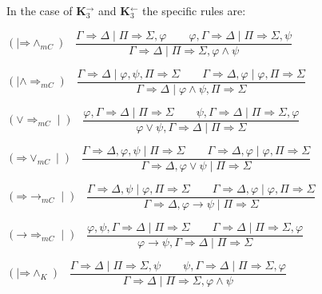 \documentclass[11pt,a4paper,titlepage]{article}
\theoremstyle{definition}
\newcommand{\3}{\vspace{.3in}}
\newcommand{\2}{\vspace{.2in}}
\newcommand{\1}{\vspace{.1in}}
\newcommand{\5}{\vspace{.05in}}
\begin{document}
\1


In the case of {\bf K$_3^\rightarrow$} and {\bf K$_3^\leftarrow$} the specific rules are:

\1

\noindent$(\mid \mathord{\Rightarrow}\mathord{\wedge_{mC}})$ \ $\dfrac{\Gamma
	\Rightarrow \Delta \mid \Pi\Rightarrow\Sigma, \varphi \qquad \varphi, \Gamma\Rightarrow\Delta \mid \Pi\Rightarrow\Sigma, \psi}{\Gamma\Rightarrow\Delta \mid \Pi\Rightarrow\Sigma, \varphi\wedge\psi}$ 

\1

\noindent$(\mid \mathord{\wedge}\mathord{\Rightarrow_{mC}})$ \ $\dfrac{\Gamma\Rightarrow \Delta \mid \varphi, \psi, \Pi\Rightarrow\Sigma \qquad \Gamma\Rightarrow\Delta, \varphi \mid \varphi, \Pi\Rightarrow\Sigma}{\Gamma\Rightarrow\Delta \mid \varphi\wedge\psi, \Pi\Rightarrow\Sigma}$ 

\1

\noindent$(\mathord{\vee}\mathord{\Rightarrow_{mC}}\mid)$ \ $\dfrac{\varphi, \Gamma
	\Rightarrow \Delta \mid \Pi\Rightarrow\Sigma \qquad \psi, \Gamma\Rightarrow\Delta \mid \Pi\Rightarrow\Sigma, \varphi}{\varphi\vee\psi, \Gamma\Rightarrow\Delta \mid \Pi\Rightarrow\Sigma}$ 

\1

\noindent$(\mathord{\Rightarrow}\mathord{\vee_{mC}}\mid)$ \ $\dfrac{\Gamma\Rightarrow \Delta, \varphi, \psi \mid \Pi\Rightarrow\Sigma \qquad \Gamma\Rightarrow\Delta, \varphi \mid \varphi, \Pi\Rightarrow\Sigma}{\Gamma\Rightarrow\Delta, \varphi\vee\psi \mid \Pi\Rightarrow\Sigma}$ 

\1

\noindent$(\mathord{\Rightarrow}\mathord{\rightarrow_{mC}}\mid)$ \ $\dfrac{\Gamma
	\Rightarrow \Delta, \psi \mid \varphi, \Pi\Rightarrow\Sigma \qquad \Gamma\Rightarrow\Delta, \varphi \mid \varphi, \Pi\Rightarrow\Sigma}{\Gamma\Rightarrow\Delta, \varphi\rightarrow\psi \mid \Pi\Rightarrow\Sigma}$ 

\1

\noindent$(\mathord{\rightarrow}\mathord{\Rightarrow_{mC}}\mid)$ \ $\dfrac{\varphi, \psi, \Gamma\Rightarrow \Delta \mid \Pi\Rightarrow\Sigma \qquad \Gamma\Rightarrow\Delta \mid \Pi\Rightarrow\Sigma, \varphi}{\varphi\rightarrow\psi, \Gamma\Rightarrow\Delta \mid \Pi\Rightarrow\Sigma}$ 

\1



\noindent$(\mid \mathord{\Rightarrow}\mathord{\wedge_K})$ \ $\dfrac{\Gamma
	\Rightarrow \Delta \mid \Pi\Rightarrow\Sigma, \psi \qquad \psi, \Gamma\Rightarrow\Delta \mid \Pi\Rightarrow\Sigma, \varphi}{\Gamma\Rightarrow\Delta \mid \Pi\Rightarrow\Sigma, \varphi\wedge\psi}$ 
\end{document}

